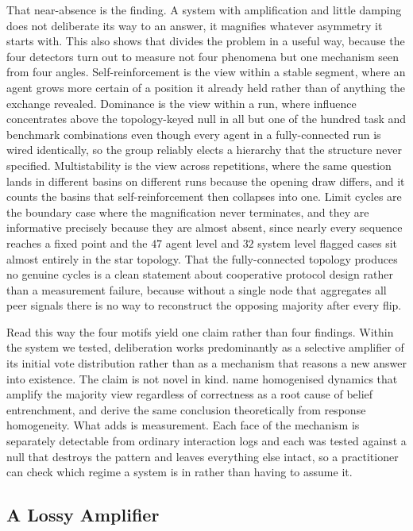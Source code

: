 That near-absence is the finding. A system with amplification and little damping does not
deliberate its way to an answer, it magnifies whatever asymmetry it starts with.
This also shows that \suitename{} divides the problem in a useful way, because the four detectors turn out to measure not four phenomena but one mechanism seen from four angles.
Self-reinforcement is the view within a stable segment, where an agent
grows more certain of a position it already held rather than of anything the
exchange revealed. Dominance is the view within a run, where influence
concentrates above the topology-keyed null in all but one of the hundred task and
benchmark combinations even though every agent in a fully-connected run is wired
identically, so the group reliably elects a hierarchy that the structure never
specified. Multistability is the view across repetitions, where the same question
lands in different basins on different runs because the opening draw differs, and
it counts the basins that self-reinforcement then collapses into one. Limit
cycles are the boundary case where the magnification never terminates, and they
are informative precisely because they are almost absent, since nearly every
sequence reaches a fixed point and the $47$ agent level and $32$ system level
flagged cases sit almost entirely in the star topology. That the fully-connected
topology produces no genuine cycles is a clean statement about cooperative
protocol design rather than a measurement failure, because without a single node
that aggregates all peer signals there is no way to reconstruct the opposing
majority after every flip.

Read this way the four motifs yield one claim rather than four findings. Within
the system we tested, deliberation works predominantly as a selective amplifier
of its initial vote distribution rather than as a mechanism that reasons a new
answer into existence. The claim is not novel in kind.
\citet{oh2026entrenchment} name homogenised dynamics that amplify the majority
view regardless of correctness as a root cause of belief entrenchment, and
\citet{estornell2024multillm} derive the same conclusion theoretically from
response homogeneity. What \suitename{} adds is measurement. Each face of the
mechanism is separately detectable from ordinary interaction logs and each was
tested against a null that destroys the pattern and leaves everything else
intact, so a practitioner can check which regime a system is in rather than
having to assume it.

\subsection{A Lossy Amplifier}
\label{sec:discussion:interpretation}

